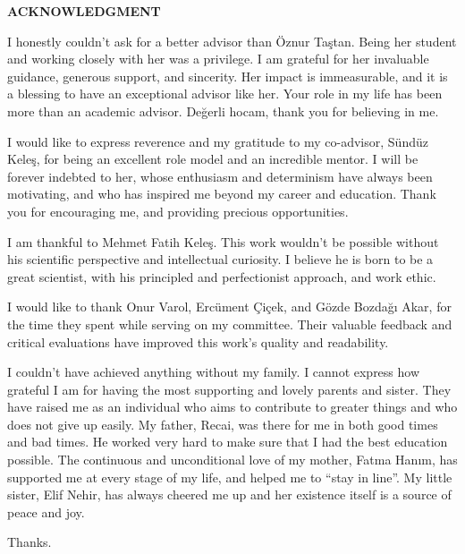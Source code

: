 \clearpage
\setlength{\parindent}{0pt}
\begin{center}
	\MakeUppercase{\textbf{acknowledgment}} \\ [3\baselineskip]
\end{center}

I honestly couldn't ask for a better advisor than Öznur Taştan.
Being her student and working closely with her was a privilege.
I am grateful for her invaluable guidance, generous support, and sincerity.
Her impact is immeasurable, and it is a blessing to have an exceptional advisor like her.
Your role in my life has been more than an academic advisor.
Değerli hocam, thank you for believing in me.

I would like to express reverence and my gratitude to my co-advisor, Sündüz Keleş, for being an excellent role model and an incredible mentor.
I will be forever indebted to her, whose enthusiasm and determinism have always been motivating, and who has inspired me beyond my career and education.
Thank you for encouraging me, and providing precious opportunities.

I am thankful to Mehmet Fatih Keleş.
This work wouldn't be possible without his scientific perspective and intellectual curiosity.
I believe he is born to be a great scientist, with his principled and perfectionist approach, and work ethic.

I would like to thank Onur Varol, Ercüment Çiçek, and Gözde Bozdağı Akar, for the time they spent while serving on my committee.
Their valuable feedback and critical evaluations have improved this work's quality and readability.


I couldn't have achieved anything without my family.
I cannot express how grateful I am for having the most supporting and lovely parents and sister.
They have raised me as an individual who aims to contribute to greater things and who does not give up easily.
My father, Recai, was there for me in both good times and bad times.
He worked very hard to make sure that I had the best education possible.
The continuous and unconditional love of my mother, Fatma Hanım, has supported me at every stage of my life, and helped me to ``stay in line''.
My little sister, Elif Nehir, has always cheered me up and her existence itself is a source of peace and joy.

Thanks.
